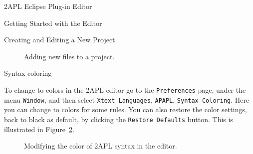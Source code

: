 \begin{section}{2APL Eclipse Plug-in Editor}
\begin{section}{Getting Started with the Editor}
\begin{subsection}{Creating and Editing a New Project}
\begin{enumerate}
            \begin{figure}[h]
                \begin{minipage}{0.6\linewidth}
                    \begin{center}
                    \end{center}
                \end{minipage}
                \hspace{.5cm}
                \begin{minipage}{0.3\linewidth}
                    \begin{center}
                    \end{center}
                \end{minipage}
                \caption{Adding new files to a project.}\label{fig:newfile1}
            \end{figure}

\end{enumerate}
\end{subsection}

\end{section}


\begin{section}{Syntax coloring}

To change to colors in the 2APL editor go to the
\texttt{Preferences} page, under the menu \texttt{Window}, and then
select \texttt{Xtext Languages}, \texttt{APAPL}, \texttt{Syntax
Coloring}. Here you can change to colors for some rules. You can
also restore the color settings, back to black as default, by
clicking the \texttt{Restore Defaults} button. This is illustrated
in Figure~\ref{fig:coloring}.

        \begin{figure}[ht]
            \begin{center}
            \end{center}\label{fig:color1}
            \caption{Modifying the color of 2APL syntax in the editor.}\label{fig:coloring}
        \end{figure}

\end{section}



\end{section}
